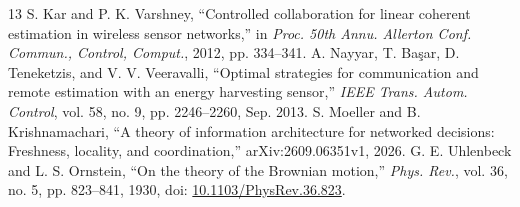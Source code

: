 \documentclass[letterpaper,10pt,conference]{ieeeconf}
\begin{document}
\begin{thebibliography}{13}
 S. Kar and P. K. Varshney, ``Controlled collaboration for linear coherent estimation in wireless sensor networks,'' in \emph{Proc. 50th Annu. Allerton Conf. Commun., Control, Comput.}, 2012, pp. 334--341.
 A. Nayyar, T. Ba\c{s}ar, D. Teneketzis, and V. V. Veeravalli, ``Optimal strategies for communication and remote estimation with an energy harvesting sensor,'' \emph{IEEE Trans. Autom. Control}, vol. 58, no. 9, pp. 2246--2260, Sep. 2013.
 S. Moeller and B. Krishnamachari, ``A theory of information architecture for networked decisions: Freshness, locality, and coordination,'' arXiv:2609.06351v1, 2026.
 G. E. Uhlenbeck and L. S. Ornstein, ``On the theory of the Brownian motion,'' \emph{Phys. Rev.}, vol. 36, no. 5, pp. 823--841, 1930, doi: \href{https://doi.org/10.1103/PhysRev.36.823}{10.1103/PhysRev.36.823}.
\end{thebibliography}
\end{document}
